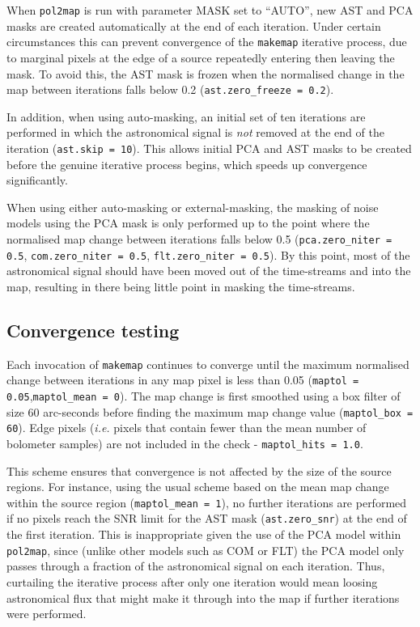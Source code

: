 \documentclass[twoside,11pt]{starlink}
\begin{document}
When \texttt{pol2map} is run with parameter MASK set to ``AUTO'', new
AST and PCA masks are created automatically at the end of each iteration.
Under certain circumstances this can prevent convergence of the
\texttt{makemap} iterative process, due to marginal pixels at the edge of
a source repeatedly entering then leaving the mask. To avoid this, the AST
mask is frozen when the normalised change in the map between iterations
falls below 0.2 (\texttt{ast.zero\_freeze = 0.2}).

In addition, when using auto-masking, an initial set of ten iterations
are performed in which the astronomical signal is \emph{not} removed at
the end of the iteration (\texttt{ast.skip = 10}). This allows initial PCA
and AST masks to be created before the genuine iterative process begins,
which speeds up convergence significantly.

When using either auto-masking or external-masking, the masking of noise
models using the PCA mask is only performed up to the point where the
normalised map change between iterations falls below 0.5
(\texttt{pca.zero\_niter = 0.5}, \texttt{com.zero\_niter = 0.5},
\texttt{flt.zero\_niter = 0.5}). By this point, most of the astronomical
signal should have been moved out of the time-streams and into the map,
resulting in there being little point in masking the time-streams.

\subsection{Convergence testing}

Each invocation of \texttt{makemap} continues to converge until the
maximum normalised change between iterations in any map pixel is less
than 0.05 (\texttt{maptol = 0.05},\texttt{maptol\_mean = 0}). The map
change is first smoothed using a  box filter of size 60 arc-seconds before
finding the maximum map change value (\texttt{maptol\_box = 60}). Edge pixels
(\emph{i.e.} pixels that contain fewer than the mean number of bolometer
samples) are not included in the check - \texttt{maptol\_hits = 1.0}.

This scheme ensures that convergence is not affected by the size of the
source regions. For instance, using the usual scheme based on the mean
map change within the source region (\texttt{maptol\_mean = 1}), no further
iterations are performed if no pixels reach the SNR limit for the AST mask
(\texttt{ast.zero\_snr}) at the end of the first iteration. This
is inappropriate given the use of the PCA model within \texttt{pol2map},
since (unlike other models such as COM or FLT) the PCA model only passes
through a fraction of the astronomical signal on each iteration. Thus,
curtailing the iterative process after only one iteration would mean loosing
astronomical flux that might make it through into the map if further
iterations were performed.
\end{document}
